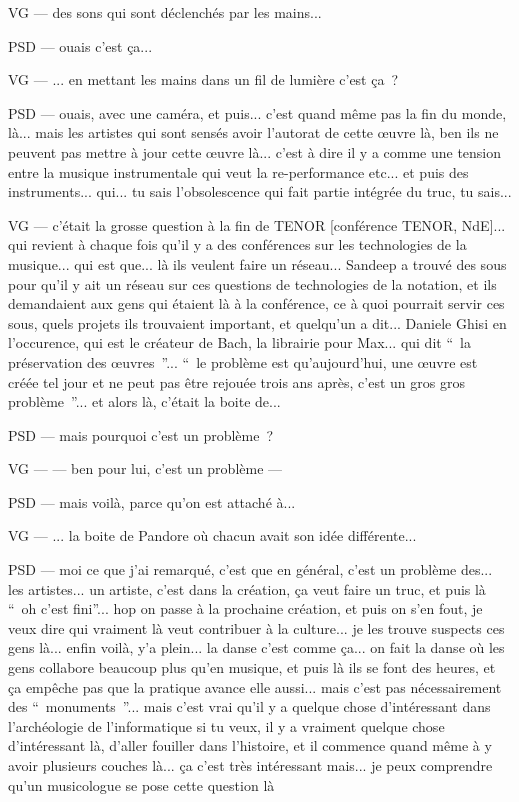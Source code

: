 VG — des sons qui sont déclenchés par les mains...

PSD — ouais c'est ça...

VG — ... en mettant les mains dans un fil de lumière c'est ça ?

PSD — ouais, avec une caméra, et puis... c'est quand même pas la fin du monde, là... mais les artistes qui sont sensés avoir l'autorat de cette œuvre là, ben ils ne peuvent pas mettre à jour cette œuvre là... c'est à dire il y a comme une tension entre la musique instrumentale qui veut la re-performance etc... et puis des instruments... qui... tu sais l'obsolescence qui fait partie intégrée du truc, tu sais...

VG — c'était la grosse question à la fin de TENOR [conférence TENOR, NdE]... qui revient à chaque fois qu'il y a des conférences sur les technologies de la musique... qui est que... là ils veulent faire un réseau... Sandeep a trouvé des sous pour qu'il y ait un réseau sur ces questions de technologies de la notation, et ils demandaient aux gens qui étaient là à la conférence, ce à quoi pourrait servir ces sous, quels projets ils trouvaient important, et quelqu'un a dit... Daniele Ghisi en l'occurence, qui est le créateur de Bach, la librairie pour Max... qui dit “ la préservation des œuvres ”... “ le problème est qu'aujourd'hui, une œuvre est créée tel jour et ne peut pas être rejouée trois ans après, c'est un gros gros problème ”... et alors là, c'était la boite de...

PSD — mais pourquoi c'est un problème ?

VG — — ben pour lui, c'est un problème —

PSD — mais voilà, parce qu'on est attaché à...

VG — ... la boite de Pandore où chacun avait son idée différente...

PSD — moi ce que j'ai remarqué, c'est que en général, c'est un problème des... les artistes... un artiste, c'est dans la création, ça veut faire un truc, et puis là “ oh c'est fini”... hop on passe à la prochaine création, et puis on s'en fout, je veux dire qui vraiment là veut contribuer à la culture... je les trouve suspects ces gens là... enfin voilà, y'a plein... la danse c'est comme ça... on fait la danse où les gens collabore beaucoup plus qu'en musique, et puis là ils se font des heures, et ça empêche pas que la pratique avance elle aussi... mais c'est pas nécessairement des “ monuments ”... mais c'est vrai qu'il y a quelque chose d'intéressant dans l'archéologie de l'informatique si tu veux, il y a vraiment quelque chose d'intéressant là, d'aller fouiller dans l'histoire, et il commence quand même à y avoir plusieurs couches là... ça c'est très intéressant mais... je peux comprendre qu'un musicologue se pose cette question là

